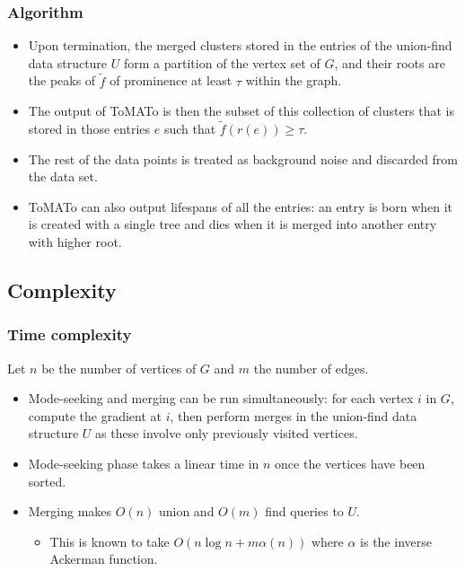\documentclass{beamer}
\theoremstyle{definition}
\begin{document}
\begin{frame}
\frametitle{Algorithm}
\begin{itemize}
\item<1-> Upon termination, the merged clusters stored in the entries of the union-find data
structure $U$ form a partition of the vertex set of $G$, and their roots are the peaks of $\tilde{f}$
of prominence at least $\tau$ within the graph. 

\item<2-> The output of ToMATo is then the subset of this collection of clusters that is stored in those entries $e$ such that $\tilde{f}(r(e))\geq \tau$. 

\item<3-> The rest of the data points is treated as
background noise and discarded from the data set.

\item<4-> ToMATo can also output lifespans of all the entries: an entry is born when it is created with a single tree and dies when it is merged into another entry with higher root.
\end{itemize}
\end{frame}

\subsection{Complexity}
\begin{frame}
\frametitle{Time complexity}
Let $n$ be the number of vertices of $G$ and $m$ the number of edges.
\begin{itemize}
\item<2-> Mode-seeking and merging can be run simultaneously: for each vertex $i$ in $G$, compute the gradient at $i$,
then perform merges in the union-find data structure $U$ as these involve only previously visited vertices.
\item<3-> Mode-seeking phase takes a linear time in $n$ once the vertices have been sorted.
\item<4-> Merging makes $O(n)$ union and $O(m)$ find queries to $U$. %
\begin{itemize}
\item <5->This is known to take $O(n \log n+m\alpha(n))$ where $\alpha$ is the inverse Ackerman function. %
\end{itemize}
\end{itemize}
\end{frame}
\end{document}
